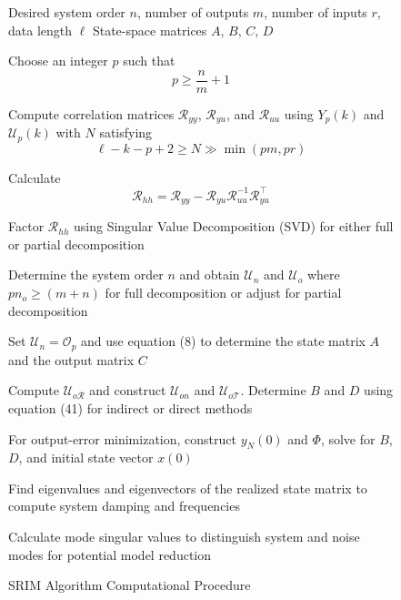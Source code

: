 \begin{figure}[htbp]
  \begin{algorithm}[H]
  \caption{SRIM Algorithm Computational Procedure}
  \begin{algorithmic}[1]
  \REQUIRE Desired system order $n$, number of outputs $m$, number of inputs $r$, data length $\ell$
  \ENSURE State-space matrices $A$, $B$, $C$, $D$
  
  \STATE Choose an integer $p$ such that \[p \geq \frac{n}{m} + 1\]
  
  \STATE Compute correlation matrices $\mathcal{R}_{yy}$, $\mathcal{R}_{yu}$, and $\mathcal{R}_{uu}$ using $Y_p(k)$ and $\mathcal{U}_p(k)$ with $N$ satisfying \[\ell - k - p + 2 \geq N \gg \min(pm, pr)\]
  
  \STATE Calculate \[\mathcal{R}_{hh} = \mathcal{R}_{yy} - \mathcal{R}_{yu}\mathcal{R}^{-1}_{uu}\mathcal{R}^\top_{yu}\]
  
  \STATE Factor $\mathcal{R}_{hh}$ using Singular Value Decomposition (SVD) for either full or partial decomposition
  
  \STATE Determine the system order $n$ and obtain $\mathcal{U}_n$ and $\mathcal{U}_o$ where $pn_o \geq (m + n)$ for full decomposition or adjust for partial decomposition
  
  \STATE Set $\mathcal{U}_n = \mathcal{O}_p$ and use equation (8) to determine the state matrix $A$ and the output matrix $C$
  
  \STATE Compute $\mathcal{U}_{o\mathcal{R}}$ and construct $\mathcal{U}_{on}$ and $\mathcal{U}_{o\mathcal{T}}$. Determine $B$ and $D$ using equation (41) for indirect or direct methods
  
  \STATE For output-error minimization, construct $y_N(0)$ and $\Phi$, solve for $B$, $D$, and initial state vector $x(0)$

  \STATE Find eigenvalues and eigenvectors of the realized state matrix to compute system damping and frequencies
  
  \STATE Calculate mode singular values to distinguish system and noise modes for potential model reduction

  \end{algorithmic}
  \end{algorithm}
\end{figure}
